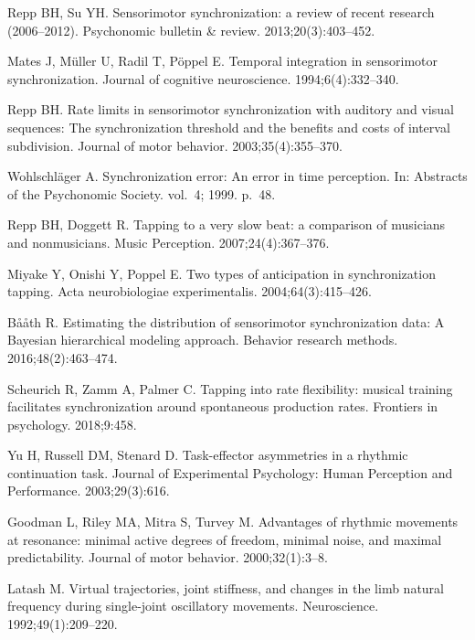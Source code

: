 \documentclass[10pt,letterpaper]{article}
\begin{document}
\begin{thebibliography}{10}
Repp BH, Su YH.
\newblock Sensorimotor synchronization: a review of recent research
  (2006--2012).
\newblock Psychonomic bulletin \& review. 2013;20(3):403--452.

Mates J, M{\"u}ller U, Radil T, P{\"o}ppel E.
\newblock Temporal integration in sensorimotor synchronization.
\newblock Journal of cognitive neuroscience. 1994;6(4):332--340.

Repp BH.
\newblock Rate limits in sensorimotor synchronization with auditory and visual
  sequences: The synchronization threshold and the benefits and costs of
  interval subdivision.
\newblock Journal of motor behavior. 2003;35(4):355--370.

Wohlschl{\"a}ger A.
\newblock Synchronization error: An error in time perception.
\newblock In: Abstracts of the Psychonomic Society. vol.~4; 1999. p.~48.

Repp BH, Doggett R.
\newblock Tapping to a very slow beat: a comparison of musicians and
  nonmusicians.
\newblock Music Perception. 2007;24(4):367--376.

Miyake Y, Onishi Y, Poppel E.
\newblock Two types of anticipation in synchronization tapping.
\newblock Acta neurobiologiae experimentalis. 2004;64(3):415--426.

B{\aa}{\aa}th R.
\newblock Estimating the distribution of sensorimotor synchronization data: A
  Bayesian hierarchical modeling approach.
\newblock Behavior research methods. 2016;48(2):463--474.

Scheurich R, Zamm A, Palmer C.
\newblock Tapping into rate flexibility: musical training facilitates
  synchronization around spontaneous production rates.
\newblock Frontiers in psychology. 2018;9:458.

Yu H, Russell DM, Stenard D.
\newblock Task-effector asymmetries in a rhythmic continuation task.
\newblock Journal of Experimental Psychology: Human Perception and Performance.
  2003;29(3):616.

Goodman L, Riley MA, Mitra S, Turvey M.
\newblock Advantages of rhythmic movements at resonance: minimal active degrees
  of freedom, minimal noise, and maximal predictability.
\newblock Journal of motor behavior. 2000;32(1):3--8.

Latash M.
\newblock Virtual trajectories, joint stiffness, and changes in the limb
  natural frequency during single-joint oscillatory movements.
\newblock Neuroscience. 1992;49(1):209--220.


\end{thebibliography}
\end{document}
